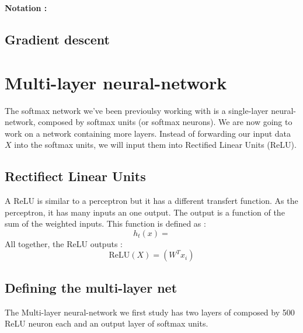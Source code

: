 		\vspace{1em}
		\textbf{Notation : }\\


	\subsection{Gradient descent}

	\section{Multi-layer neural-network}
		The softmax network we've been previoulsy working with is a single-layer  neural-network, composed by softmax units (or softmax neurons). We are now going to work on a network containing more layers. Instead of forwarding our input data $X$ into the softmax units, we will input them into Rectified Linear Units (ReLU).

		\subsection{Rectifiect Linear Units}
		A ReLU is similar to a perceptron but it has a different transfert function. As the perceptron, it has many inputs an one output. The output is a function of the sum of the weighted inputs. This function is defined as :
		$$ h_t(x) =  $$
		All together, the ReLU outputs :
		$$ \text{ReLU}(X) =  (W^Tx_i) $$

		\subsection{Defining the multi-layer net}
		The Multi-layer neural-network we first study has two layers of composed by 500 ReLU neuron each and an output layer of softmax units. 